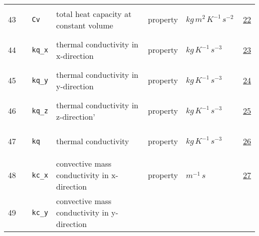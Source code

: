 \begin{longtable}{|p{1cm}|p{2.5cm}|p{4.5cm}|p{8cm}|p{3.0cm}|p{3cm}|p{1cm}|}
        43
             & \hypertarget{"v:43"}{ $ {} $}
             & \verb|Cv|
             & total heat capacity at constant volume
             & \begin{lay}property \end{lay}
             & $ kg \,m^{2} \,K^{-1} \,s^{-2} \, $
             &                 \hyperlink{"e:22"}{ 22 }
                 \\
        44
             & \hypertarget{"v:44"}{ $ {} $}
             & \verb|kq_x|
             & thermal conductivity in x-direction
             & \begin{lay}property \end{lay}
             & $ kg \,K^{-1} \,s^{-3} \, $
             &                 \hyperlink{"e:23"}{ 23 }
                 \\
        45
             & \hypertarget{"v:45"}{ $ {} $}
             & \verb|kq_y|
             & thermal conductivity in y-direction
             & \begin{lay}property \end{lay}
             & $ kg \,K^{-1} \,s^{-3} \, $
             &                 \hyperlink{"e:24"}{ 24 }
                 \\
        46
             & \hypertarget{"v:46"}{ $ {} $}
             & \verb|kq_z|
             & thermal conductivity in z-direction'
             & \begin{lay}property \end{lay}
             & $ kg \,K^{-1} \,s^{-3} \, $
             &                 \hyperlink{"e:25"}{ 25 }
                 \\
        47
             & \hypertarget{"v:47"}{ $ {} $}
             & \verb|kq|
             & thermal conductivity
             & \begin{lay}property \end{lay}
             & $ kg \,K^{-1} \,s^{-3} \, $
             &                 \hyperlink{"e:26"}{ 26 }
                 \\
        48
             & \hypertarget{"v:48"}{ $ {} $}
             & \verb|kc_x|
             & convective mass conductivity in x-direction
             & \begin{lay}property \end{lay}
             & $ m^{-1} \,s \, $
             &                 \hyperlink{"e:27"}{ 27 }
                 \\
        49
             & \hypertarget{"v:49"}{ $ {} $}
             & \verb|kc_y|
             & convective mass conductivity in y-direction

\end{longtable}
